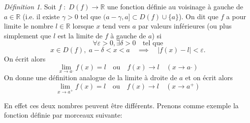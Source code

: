 \documentclass[oneside,12pt,french,table]{book}
\theoremstyle{definition}
\theoremstyle{plain}
\theoremstyle{remark}
\newtheorem{defi}[definition]{Définition}
\newcommand{\Rr}{{\mathbb{R}}}
\begin{document}
\begin{defi}
    Soit $f\;:\;D(f)\longrightarrow\Rr$ une fonction définie au voisinage à gauche de $a\in\Rr$ (i.e. il existe $\gamma>0$ tel que $(a-\gamma,a]\subset D(f)\cup \{a\}$).
    On dit que $f$ a pour limite le nombre $l\in\Rr$ lorsque $x$ tend vers $a$ par valeurs inférieures (ou plus simplement que $l$ est la limite de $f$ à gauche de $a$) si \[
    \forall \varepsilon>0,\exists\delta>0 \quad\text{tel que}
    \]
    \[
    x\in D(f), \;a-\delta<x<a \quad \implies \quad |f(x)-l|<\varepsilon .
    \]
    On écrit alors\[
    \lim_{x\rightarrow a^{\_}}f(x)=l \quad \text{ou} \quad f(x)\longrightarrow l \quad (x\rightarrow a^{\_})
    \]
    On donne une définition analogue de la limite à droite de $a$ et on écrit alors \[
    \lim_{x\rightarrow a^+}f(x)=l \quad \text{ou} \quad f(x)\longrightarrow l \quad (x\rightarrow a^{+})
    \]
\end{defi}
En effet ces deux nombres peuvent être différents. Prenons comme exemple la fonction définie par morceaux suivante:
\end{document}
